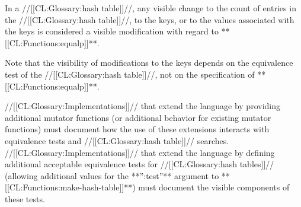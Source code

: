 \endsubsubsubsection%

  In a //[[CL:Glossary:hash table]]//, any visible change
     to the count of entries in the //[[CL:Glossary:hash table]]//,
     to the keys,
  or to the values associated with the keys is considered a visible modification with regard to **[[CL:Functions:equalp]]**.

Note that the visibility of modifications to the keys depends on the equivalence test of the //[[CL:Glossary:hash table]]//, not on the specification of **[[CL:Functions:equalp]]**.
  \endsubsubsubsection%

\endsubsubsection%


//[[CL:Glossary:Implementations]]// that extend the language by providing additional mutator functions (or additional behavior for existing mutator functions) must document how the use of these extensions interacts with equivalence tests and //[[CL:Glossary:hash table]]// searches.
  //[[CL:Glossary:Implementations]]// that extend the language by defining additional acceptable equivalence tests for //[[CL:Glossary:hash tables]]// (allowing additional values for the **'':test''** argument to **[[CL:Functions:make-hash-table]]**) must document the visible components of these tests.

\endsubsubsection%

\endsubsection%
